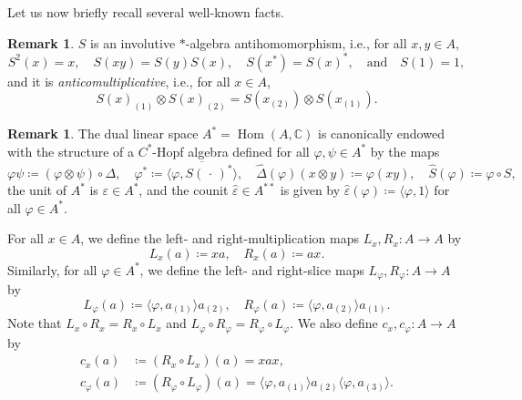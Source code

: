 \documentclass[a4paper,10pt]{amsart}
\newcommand{\eval}[2]{\langle #1 , #2\rangle}
\newcommand{\placeholder}{\,\cdot\,}
\newcommand{\newterm}[1]{\emph{#1}}
\theoremstyle{definition}
\newtheorem{remark}[theorem]{Remark}
\begin{document}
Let us now briefly recall several well-known facts.
\begin{remark}
    $S$ is an involutive $*$-algebra antihomomorphism, i.e., for all $x,y\in A$,
    \begin{equation}
    \label{eq:PropsAntipode}
    	S^2(x) = x,
        \quad
        S(xy) = S(y) S(x),
        \quad
        S(x^*) = S(x)^*,
        \quad
        \text{and}
        \quad
        S(1) = 1,
    \end{equation}
    and it is \newterm{anticomultiplicative}, i.e., for all $x\in A$,
    \begin{equation}
    \label{eq:Santicomult}
    	S(x)_{(1)} \otimes S(x)_{(2)}
        =
        S(x_{(2)}) \otimes S(x_{(1)}).
    \end{equation}
\end{remark}

\begin{remark}\label{rem:dualA}
The dual linear space $A^* = \operatorname{Hom}(A,\mathbb{C})$ is canonically endowed with the structure of a $C^*$-Hopf algebra defined for all $\varphi,\psi\in A^*$ by the maps
\begin{equation*}
	\varphi \psi \coloneqq (\varphi \otimes \psi) \circ \Delta,
    \quad
    \varphi^* \coloneqq \overline{\eval{\varphi}{S(\placeholder)^*}},
    \quad
    \hat\Delta(\varphi)(x\otimes y) \coloneqq  \varphi(xy),
    \quad
    \hat{S}(\varphi)  \coloneqq  \varphi \circ S,
\end{equation*}
the unit of $A^*$ is $\varepsilon\in A^*$, and the counit $\hat\varepsilon\in A^{**}$ is given by $\hat\varepsilon(\varphi) \coloneqq \eval{\varphi}{1}$ for all $\varphi\in A^*$.
\end{remark}

For all $x\in A$, we define the left- and right-multiplication maps $L_x,R_x:A\to A$ by
\begin{equation}
    \label{eq:DefLRelement}
    L_x(a) \coloneqq xa,
    \quad
    R_x(a) \coloneqq ax.
\end{equation}
Similarly, for all $\varphi\in A^*$, we define the left- and right-slice maps $L_\varphi,R_\varphi:A\to A$ by
\begin{equation}
    \label{eq:DefLRfunctional}
    L_\varphi(a) \coloneqq \eval{\varphi}{a_{(1)}} a_{(2)},
    \quad
    R_\varphi(a) \coloneqq \eval{\varphi}{a_{(2)}}a_{(1)}.
\end{equation}
Note that $L_x\circ R_x = R_x \circ L_x$ and $L_\varphi\circ R_\varphi = R_\varphi \circ L_\varphi$.
We also define $c_x,c_\varphi:A\to A$ by
\begin{align}\label{eq:DefConjugations}
    c_x(a)
        & \coloneqq
            (R_x \circ L_x)(a) = xax,
    \\
    c_\varphi(a)
        & \coloneqq
            (R_\varphi \circ L_\varphi)(a)
        =
            \eval{\varphi}{a_{(1)}} a_{(2)}
                \eval{\varphi}{a_{(3)}}.
\end{align}
\end{document}
